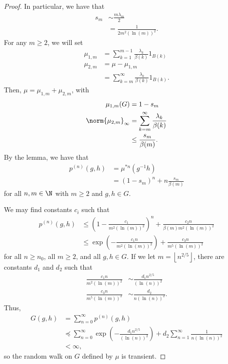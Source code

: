 \documentclass[10pt]{mypackage}
\begin{document}
\begin{proof}
  In particular, we have that
  \begin{align*}
    s_m &\sim \frac{m\lambda_m}{2}\\
        &= \frac{1}{2m^2\left( \ln(m) \right)^2}.
  \end{align*}
  For any $m\geq 2$, we will set
  \begin{align*}
    \mu_{1,m} &= \sum_{k=1}^{m-1} \frac{\lambda_k}{\beta(k)}1_{B(k)}\\
    \mu_{2,m} &= \mu-\mu_{1,m}\\
              &= \sum_{k=m}^{\infty} \frac{\lambda_k}{\beta(k)}1_{B(k)}.
  \end{align*}
  Then, $\mu = \mu_{1,m} + \mu_{2,m}$, with
  \begin{align*}
    \mu_{1,m}(G) &= 1-s_m\\
    \norm{\mu_{2,m}}_{\infty} &= \sum_{k=m}^{\infty} \frac{\lambda_k}{\beta(k)}\\
                              &\leq \frac{s_m}{\beta(m)}.
  \end{align*}
  By the lemma, we have that
  \begin{align*}
    p^{(n)}\left( g,h \right) &= \mu^{\ast n}\left( g^{-1}h \right)\\
                              &= \left( 1-s_m \right)^{n} + n\frac{s_m}{\beta(m)}
  \end{align*}
  for all $n,m\in \N$ with $m\geq 2$ and $g,h\in G$.

  We may find constants $c_i$ such that
  \begin{align*}
    p^{(n)}\left( g,h \right) &\leq \left( 1-\frac{c_1}{m^2\left( \ln(m) \right)^2} \right)^{n} + \frac{c_2n}{\beta(m)m^2\left( \ln(m) \right)^2}\\
                              &\leq \exp\left( -\frac{c_1n}{m^2\left( \ln(m) \right)^2} \right) + \frac{c_3n}{m^{5}\left( \ln(m) \right)^2}
  \end{align*}
  for all $n\geq n_0$, all $m\geq 2$, and all $g,h\in G$. If we let $m = \left\lfloor n^{2/5}\right\rfloor$, there are constants $d_1$ and $d_2$ such that
  \begin{align*}
    \frac{c_1n}{m^2\left( \ln(m) \right)^2} &\sim \frac{d_1 n^{2/5}}{\left( \ln(n) \right)^2}\\
    \frac{c_3n}{m^{5}\left( \ln(m) \right)^2} &\sim \frac{d_2}{n \left( \ln(n) \right)^2}.
  \end{align*}
  Thus,
  \begin{align*}
    G\left( g,h \right) &= \sum_{n=0}^{\infty} p^{(n)}\left( g,h \right)\\
                        &\preceq \sum_{n=0}^{\infty} \exp\left( -\frac{d_1 n^{2/5}}{\left( \ln(n) \right)^2} \right) + d_2 \sum_{n=1}^{\infty} \frac{1}{n\left( \ln(n) \right)^2}\\
                        &< \infty,
  \end{align*}
  so the random walk on $G$ defined by $\mu$ is transient.
\end{proof}
\end{document}
